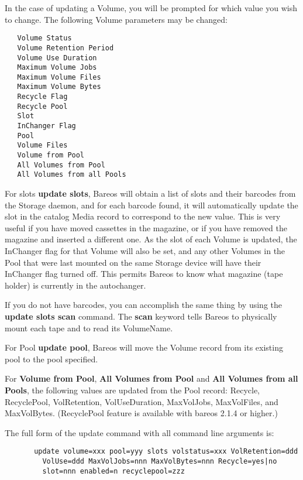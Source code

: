 \begin{description}
In the case of updating a  Volume, you will be prompted for which value you
wish to change.  The following Volume parameters may be changed:

\footnotesize
\begin{verbatim}
   Volume Status
   Volume Retention Period
   Volume Use Duration
   Maximum Volume Jobs
   Maximum Volume Files
   Maximum Volume Bytes
   Recycle Flag
   Recycle Pool
   Slot
   InChanger Flag
   Pool
   Volume Files
   Volume from Pool
   All Volumes from Pool
   All Volumes from all Pools
\end{verbatim}
\normalsize

   For slots {\bf update slots}, Bareos will obtain a list of slots and
   their barcodes from the Storage daemon, and for each barcode found, it
   will automatically update the slot in the catalog Media record to
   correspond to the new value.  This is very useful if you have moved
   cassettes in the magazine, or if you have removed the magazine and
   inserted a different one.  As the slot of each Volume is updated, the
   InChanger flag for that Volume will also be set, and any other Volumes
   in the Pool that were last mounted on the same Storage device
   will have their InChanger flag turned off.  This permits
   Bareos to know what magazine (tape holder) is currently in the
   autochanger.

   If you do not have barcodes, you can accomplish the same thing
   by using the {\bf update slots scan} command.
   The {\bf scan} keyword tells Bareos to physically mount each tape and to
   read its VolumeName.

   For Pool {\bf update pool}, Bareos will move the Volume record from its
   existing pool to the pool specified.

   For {\bf Volume from Pool}, {\bf All Volumes from Pool} and {\bf All Volumes
     from all Pools}, the following values are updated from the Pool record:
   Recycle, RecyclePool, VolRetention, VolUseDuration, MaxVolJobs, MaxVolFiles,
   and MaxVolBytes.  (RecyclePool feature is available with bareos 2.1.4 or
   higher.)

   The full form of the update command with all command line arguments is:

\footnotesize
\begin{verbatim}
       update volume=xxx pool=yyy slots volstatus=xxx VolRetention=ddd
         VolUse=ddd MaxVolJobs=nnn MaxVolBytes=nnn Recycle=yes|no
         slot=nnn enabled=n recyclepool=zzz

\end{verbatim}
\normalsize


\end{description}
